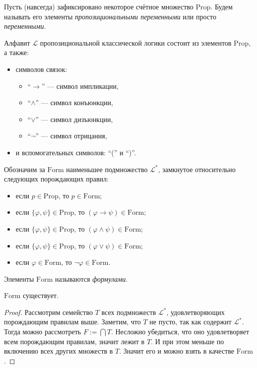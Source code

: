 \documentclass[12pt,a4paper]{article}
\newcommand{\Prop}{\ensuremath{\mathrm{Prop}}\xspace}
\newcommand{\Formul}{\ensuremath{\mathrm{Form}}\xspace}
\begin{document}
    \begin{definition}
        Пусть (навсегда) зафиксировано некоторое счётное множество \Prop. Будем называть его элементы \emph{пропозициональными переменными} или просто \emph{переменными}.

        Алфавит $\mathscr{L}$ пропозициональной классической логики состоит из элементов \Prop, а также:
        \begin{itemize}
            \item символов связок:
                \begin{itemize}
                    \item ``$\rightarrow$'' --- символ импликации,
                    \item ``$\wedge$'' --- символ конъюнкции,
                    \item ``$\vee$'' --- символ дизъюнкции,
                    \item ``$\neg$'' --- символ отрицания,
                \end{itemize}
            \item и вспомогательных символов: ``('' и ``)''.
        \end{itemize}

        Обозначим за \Formul наименьшее подмножество $\mathscr{L}^*$, замкнутое относительно следующих порождающих правил:
        \begin{itemize}
            \item если $p \in \Prop$, то $p \in \Formul$;
            \item если $\{\varphi, \psi\} \in \Prop$, то $(\varphi \rightarrow \psi) \in \Formul$;
            \item если $\{\varphi, \psi\} \in \Prop$, то $(\varphi \wedge \psi) \in \Formul$;
            \item если $\{\varphi, \psi\} \in \Prop$, то $(\varphi \vee \psi) \in \Formul$;
            \item если $\varphi \in \Formul$, то $\neg \varphi \in \Formul$.
        \end{itemize}
        Элементы \Formul называются \emph{формулами}.
    \end{definition}

    \begin{theorem}
        \Formul существует.
    \end{theorem}

    \begin{proof}
        Рассмотрим семейство $T$ всех подмножеств $\mathscr{L}^*$, удовлетворяющих порождающим правилам выше. Заметим, что $T$ не пусто, так как содержит $\mathscr{L}^*$. Тогда можно рассмотреть $F := \bigcap T$. Несложно убедиться, что оно удовлетворяет всем порождающим правилам, значит лежит в $T$. И при этом меньше по включению всех других множеств в $T$. Значит его и можно взять в качестве $\Formul$.
    \end{proof}
\end{document}
